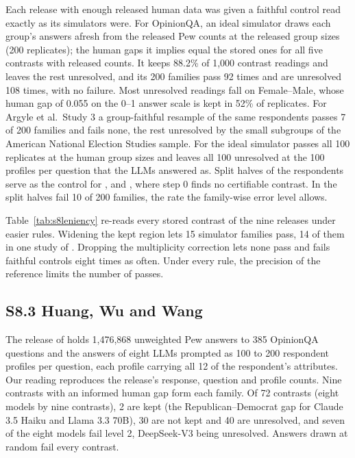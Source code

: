 Each release with enough released human data was given a faithful control read exactly as its simulators were.
For OpinionQA, an ideal simulator draws each group's answers afresh from the released Pew counts at the released group sizes (200 replicates); the human gaps it implies equal the stored ones for all five contrasts with released counts.
It keeps 88.2\% of 1,000 contrast readings and leaves the rest unresolved, and its 200 families pass 92 times and are unresolved 108 times, with no failure.
Most unresolved readings fall on Female--Male, whose human gap of 0.055 on the 0--1 answer scale is kept in 52\% of replicates.
For Argyle et al.\ Study 3 a group-faithful resample of the same respondents passes 7 of 200 families and fails none, the rest unresolved by the small subgroups of the American National Election Studies sample.
For \citet{huang2025uncertainty} the ideal simulator passes all 100 replicates at the human group sizes and leaves all 100 unresolved at the 100 profiles per question that the LLMs answered as.
Split halves of the respondents serve as the control for \citet{peng2025funhouse}, \citet{malmberg2026conjoint} and \citet{cummins2026flexibility}, where step 0 finds no certifiable contrast.
In \citet{cummins2026flexibility} the split halves fail 10 of 200 families, the rate the family-wise error level allows.



Table~\ref{tab:s8leniency} re-reads every stored contrast of the nine releases under easier rules.
Widening the kept region lets 15 simulator families pass, 14 of them in one study of \citet{peng2025funhouse}.
Dropping the multiplicity correction lets none pass and fails faithful controls eight times as often.
Under every rule, the precision of the reference limits the number of passes.

\subsection*{S8.3 Huang, Wu and Wang}

The release of \citet{huang2025uncertainty} holds 1,476,868 unweighted Pew answers to 385 OpinionQA questions and the answers of eight LLMs prompted as 100 to 200 respondent profiles per question, each profile carrying all 12 of the respondent's attributes.
Our reading reproduces the release's response, question and profile counts.
Nine contrasts with an informed human gap form each family.
Of 72 contrasts (eight models by nine contrasts), 2 are kept (the Republican--Democrat gap for Claude 3.5 Haiku and Llama 3.3 70B), 30 are not kept and 40 are unresolved, and seven of the eight models fail level 2, DeepSeek-V3 being unresolved.
Answers drawn at random fail every contrast.

